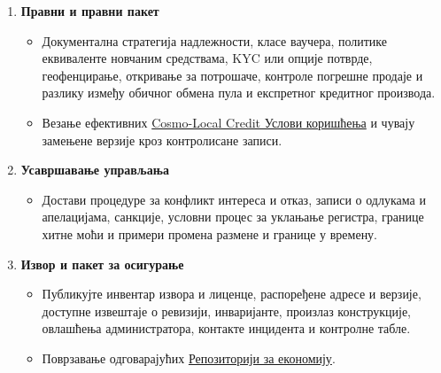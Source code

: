 \documentclass[11pt]{article}
\begin{document}
\begin{enumerate}[leftmargin=*]
\item \textbf{Правни и правни пакет}
\begin{itemize}[leftmargin=*]
\item Документална стратегија надлежности, класе ваучера, политике еквиваленте новчаним средствама, KYC или опције потврде, геофенцирање, откривање за потрошаче, контроле погрешне продаје и разлику између обичног обмена пула и експретног кредитног производа.
\item Везање ефективних \href{https://docs.cosmolocal.credit/sr/governance/terms}{Cosmo-Local Credit Услови коришћења} и чувају замењене верзије кроз контролисане записи.
\end{itemize}
\item \textbf{Усавршавање управљања}
\begin{itemize}[leftmargin=*]
\item Достави процедуре за конфликт интереса и отказ, записи о одлукама и апелацијама, санкције, условни процес за уклањање регистра, границе хитне моћи и примери промена размене и границе у времену.
\end{itemize}
\item \textbf{Извор и пакет за осигурање}
\begin{itemize}[leftmargin=*]
\item Публикујте инвентар извора и лиценце, распоређене адресе и верзије, доступне извештаје о ревизији, инваријанте, произлаз конструкције, овлашћења администратора, контакте инцидента и контролне табле.
\item Поврзавање одговарајућих \href{https://github.com/grassrootseconomics}{Репозиторији за економију}.
\end{itemize}
\end{enumerate}
\end{document}
